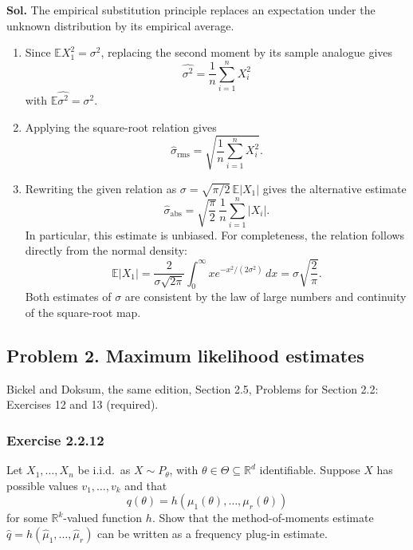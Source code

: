 \documentclass[lang=en,11pt,a4paper,citestyle=authoryear]{elegantpaper}
\newcommand{\R}{\mathbb{R}}
\newcommand{\E}{\mathbb{E}}
\begin{document}
\par\vspace{0.5em}\noindent\textbf{Sol.}
The empirical substitution principle replaces an expectation under the
unknown distribution by its empirical average.
\begin{enumerate}[label=(\alph*),leftmargin=*]
\item Since $\E X_1^2=\sigma^2$, replacing the second moment by its
sample analogue gives
\[
{\widehat{\sigma^2}=\frac1n\sum_{i=1}^nX_i^2}
\]
with $\E\widehat{\sigma^2}=\sigma^2$.

\item Applying the square-root relation gives
\[
{\widehat\sigma_{\mathrm{rms}}
=\sqrt{\frac1n\sum_{i=1}^nX_i^2}.}
\]


\item Rewriting the given relation as
$\sigma=\sqrt{\pi/2}\,\E|X_1|$ gives the alternative estimate
\[
{\widehat\sigma_{\mathrm{abs}}
=\sqrt{\frac\pi2}\,\frac1n\sum_{i=1}^n|X_i|.}
\]
In particular, this estimate is unbiased. For completeness, the relation
follows directly from the normal density:
\[
\E|X_1|
=\frac{2}{\sigma\sqrt{2\pi}}
\int_0^\infty x e^{-x^2/(2\sigma^2)}\,dx
=\sigma\sqrt{\frac2\pi}.
\]
Both estimates of $\sigma$ are consistent by the law of large numbers
and continuity of the square-root map.
\end{enumerate}

\subsection*{Problem 2. Maximum likelihood estimates}
Bickel and Doksum, the same edition, Section 2.5,
Problems for Section 2.2: Exercises 12 and 13 (required).

\subsubsection*{Exercise 2.2.12}
Let $X_1,\ldots,X_n$ be i.i.d.\ as $X\sim P_\theta$, with
$\theta\in\Theta\subseteq\R^d$ identifiable. Suppose $X$ has possible
values $v_1,\ldots,v_k$ and that
\[
q(\theta)=h(\mu_1(\theta),\ldots,\mu_r(\theta))
\]
for some $\R^k$-valued function $h$. Show that the method-of-moments
estimate $\widehat q=h(\widehat\mu_1,\ldots,\widehat\mu_r)$ can be
written as a frequency plug-in estimate.
\end{document}
